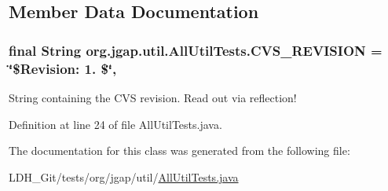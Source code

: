 \subsection{Member Data Documentation}
\hypertarget{classorg_1_1jgap_1_1util_1_1_all_util_tests_a4485e096f85101ec256a4dffbf55f258}{
\subsubsection[{C\-V\-S\-\_\-\-R\-E\-V\-I\-S\-I\-O\-N}]{\setlength{\rightskip}{0pt plus 5cm}final String org.\-jgap.\-util.\-All\-Util\-Tests.\-C\-V\-S\-\_\-\-R\-E\-V\-I\-S\-I\-O\-N = \char`\"{}\$Revision\-: 1. \$\char`\"{}\hspace{0.3cm}{\ttfamily [static]}, {\ttfamily [private]}}}\label{classorg_1_1jgap_1_1util_1_1_all_util_tests_a4485e096f85101ec256a4dffbf55f258}
String containing the C\-V\-S revision. Read out via reflection! 

Definition at line 24 of file All\-Util\-Tests.\-java.



The documentation for this class was generated from the following file\-:\begin{DoxyCompactItemize}
\item 
L\-D\-H\-\_\-\-Git/tests/org/jgap/util/\hyperlink{_all_util_tests_8java}{All\-Util\-Tests.\-java}\end{DoxyCompactItemize}
